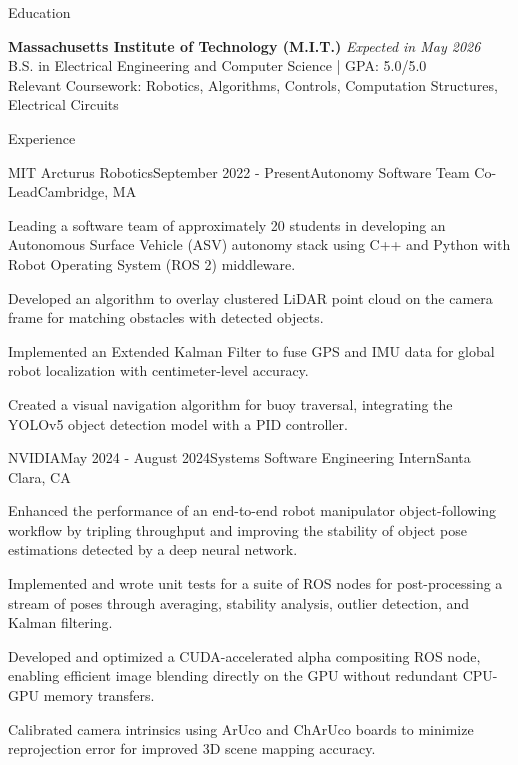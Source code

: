 \documentclass[
	10pt,
]{resume}
\begin{document}
\begin{rSection}{Education}

	\textbf{Massachusetts Institute of Technology (M.I.T.)} \hfill \textit{Expected in May 2026} \\ 
	B.S. in Electrical Engineering and Computer Science | GPA: 5.0/5.0 \\
    Relevant Coursework: Robotics, Algorithms, Controls, Computation Structures, Electrical Circuits
\end{rSection}

\begin{rSection}{Experience}

	\begin{rSubsection}{MIT Arcturus Robotics}{September 2022 - Present}{Autonomy Software Team Co-Lead}{Cambridge, MA}
    \item Leading a software team of approximately 20 students in developing an Autonomous Surface Vehicle (ASV) autonomy stack using C++ and Python with Robot Operating System (ROS 2) middleware.
    \item Developed an algorithm to overlay clustered LiDAR point cloud on the camera frame for matching obstacles with detected objects.
    \item Implemented an Extended Kalman Filter to fuse GPS and IMU data for global robot localization with centimeter-level accuracy.
    \item Created a visual navigation algorithm for buoy traversal, integrating the YOLOv5 object detection model with a PID controller.
    \end{rSubsection}

	\begin{rSubsection}{NVIDIA}{May 2024 - August 2024}{Systems Software Engineering Intern}{Santa Clara, CA}
    \item Enhanced the performance of an end-to-end robot manipulator object-following workflow by tripling throughput and improving the stability of object pose estimations detected by a deep neural network.
    \item Implemented and wrote unit tests for a suite of ROS nodes for post-processing a stream of poses through averaging, stability analysis, outlier detection, and Kalman filtering.
    \item Developed and optimized a CUDA-accelerated alpha compositing ROS node, enabling efficient image blending directly on the GPU without redundant CPU-GPU memory transfers.
    \item Calibrated camera intrinsics using ArUco and ChArUco boards to minimize reprojection error for improved 3D scene mapping accuracy.
    \end{rSubsection}


\end{rSection}
\end{document}
